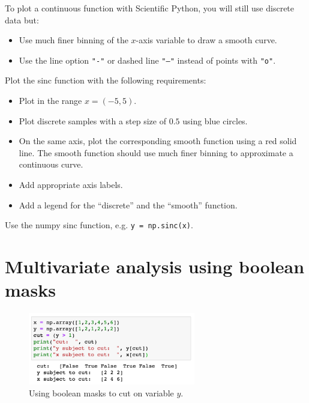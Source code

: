 To plot a continuous function with Scientific Python, you will still
use discrete data but:
\begin{itemize}
 \item Use much finer binning of the $x$-axis variable to draw a smooth curve. 
 \item Use the line option {\tt "-"} or dashed line {\tt "--"} instead of points with {\tt "o"}. 
\end{itemize} 

\noindent
\begin{plot} \end{plot}
Plot the sinc function with the following requirements:
\begin{itemize}
 \item Plot in the range $x = (-5,5)$.
 \item Plot discrete samples with a step size of $0.5$ using blue circles.
 \item On the same axis, plot the corresponding smooth function using
   a red solid line.  The smooth function should use much finer
   binning to approximate a continuous curve.
 \item Add appropriate axis labels. 
 \item Add a legend for the ``discrete'' and the ``smooth''  function.
\end{itemize}
Use the numpy sinc function, e.g. {\tt y = np.sinc(x)}.


\section{Multivariate analysis using boolean masks}
\begin{figure}[htbp]
\begin{center}
\includegraphics[width=0.65\textwidth]{figs/plotting/booleanmasks.png} 
\caption{Using boolean masks to cut on variable $y$.}
\label{fig:booleanmasks}
\end{center}
\end{figure}


